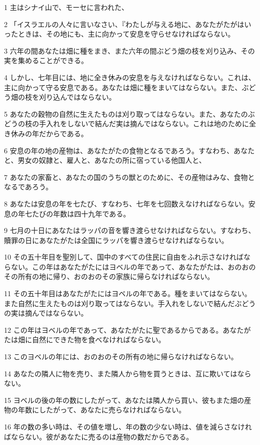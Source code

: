 \par 1 主はシナイ山で、モーセに言われた、
\par 2 「イスラエルの人々に言いなさい、『わたしが与える地に、あなたがたがはいったときは、その地にも、主に向かって安息を守らせなければならない。
\par 3 六年の間あなたは畑に種をまき、また六年の間ぶどう畑の枝を刈り込み、その実を集めることができる。
\par 4 しかし、七年目には、地に全き休みの安息を与えなければならない。これは、主に向かって守る安息である。あなたは畑に種をまいてはならない。また、ぶどう畑の枝を刈り込んではならない。
\par 5 あなたの穀物の自然に生えたものは刈り取ってはならない。また、あなたのぶどうの枝の手入れをしないで結んだ実は摘んではならない。これは地のために全き休みの年だからである。
\par 6 安息の年の地の産物は、あなたがたの食物となるであろう。すなわち、あなたと、男女の奴隷と、雇人と、あなたの所に宿っている他国人と、
\par 7 あなたの家畜と、あなたの国のうちの獣とのために、その産物はみな、食物となるであろう。
\par 8 あなたは安息の年を七たび、すなわち、七年を七回数えなければならない。安息の年七たびの年数は四十九年である。
\par 9 七月の十日にあなたはラッパの音を響き渡らせなければならない。すなわち、贖罪の日にあなたがたは全国にラッパを響き渡らせなければならない。
\par 10 その五十年目を聖別して、国中のすべての住民に自由をふれ示さなければならない。この年はあなたがたにはヨベルの年であって、あなたがたは、おのおのその所有の地に帰り、おのおのその家族に帰らなければならない。
\par 11 その五十年目はあなたがたにはヨベルの年である。種をまいてはならない。また自然に生えたものは刈り取ってはならない。手入れをしないで結んだぶどうの実は摘んではならない。
\par 12 この年はヨベルの年であって、あなたがたに聖であるからである。あなたがたは畑に自然にできた物を食べなければならない。
\par 13 このヨベルの年には、おのおのその所有の地に帰らなければならない。
\par 14 あなたの隣人に物を売り、また隣人から物を買うときは、互に欺いてはならない。
\par 15 ヨベルの後の年の数にしたがって、あなたは隣人から買い、彼もまた畑の産物の年数にしたがって、あなたに売らなければならない。
\par 16 年の数の多い時は、その値を増し、年の数の少ない時は、値を減らさなければならない。彼があなたに売るのは産物の数だからである。
